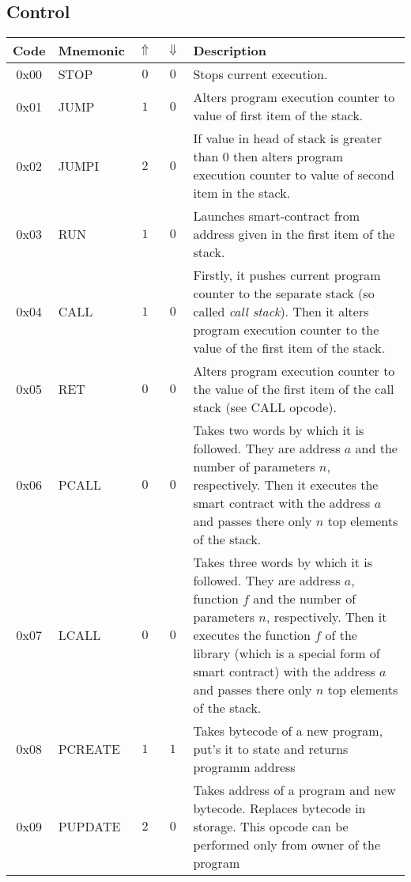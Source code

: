 \documentclass[12pt,a4paper]{article}
\begin{document}
\subsection{Control}
\begin{tabularx}{\textwidth}{ c l c c p{7cm} }
\textbf{Code} & \textbf{Mnemonic} & \textbf{$\Uparrow$} & \textbf{$\Downarrow$} & \textbf{Description} \\
\hline
0x00 & STOP & $0$ & $0$ & Stops current execution. \\
\hline
0x01 & JUMP & $1$ & $0$ & Alters program execution counter to value of first item of the stack. \\
\hline
0x02 & JUMPI & $2$ & $0$ & If value in head of stack is greater than 0 then alters program execution counter to value of second item in the stack.  \\
\hline
0x03 & RUN & $1$ & $0$ & Launches smart-contract from address given in the first item of the stack.  \\
\hline
0x04 & CALL & $1$ & $0$ & Firstly, it pushes current program counter to the separate stack (so called \emph{call stack}). Then it alters program execution counter to the value of the first item of the stack.  \\
\hline
0x05 & RET & $0$ & $0$ & Alters program execution counter to the value of the first item of the call stack (see CALL opcode).  \\
\hline
0x06 & PCALL & $0$ & $0$ & Takes two words by which it is followed. They are address $a$ and the number of parameters $n$, respectively. Then it executes the smart contract with the address $a$ and passes there only $n$ top elements of the stack.  \\
\hline
0x07 & LCALL & $0$ & $0$ & Takes three words by which it is followed. They are address $a$, function $f$ and the number of parameters $n$, respectively. Then it executes the function $f$ of the library (which is a special form of smart contract) with the address $a$ and passes there only $n$ top elements of the stack. \\
\hline
0x08 & PCREATE & $1$ & $1$ & Takes bytecode of a new program, put's it to state and returns programm address \\
\hline
0x09 & PUPDATE & $2$ & $0$ & Takes address of a program and new bytecode. Replaces bytecode in storage. This opcode can be performed only from owner of the program \\
\hline

\end{tabularx}
\end{document}
